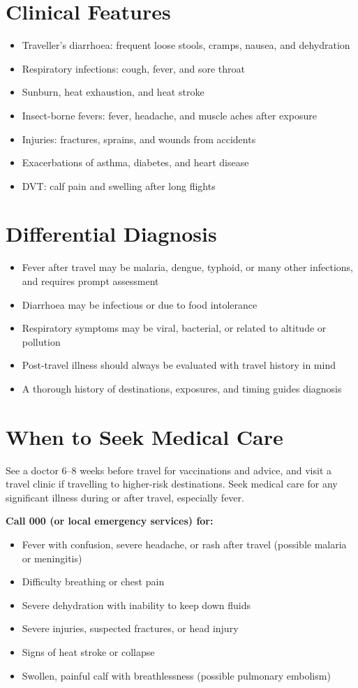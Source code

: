 \section*{Clinical Features}
\begin{itemize}
    \item Traveller's diarrhoea: frequent loose stools, cramps, nausea, and dehydration
    \item Respiratory infections: cough, fever, and sore throat
    \item Sunburn, heat exhaustion, and heat stroke
    \item Insect-borne fevers: fever, headache, and muscle aches after exposure
    \item Injuries: fractures, sprains, and wounds from accidents
    \item Exacerbations of asthma, diabetes, and heart disease
    \item DVT: calf pain and swelling after long flights
\end{itemize}

\section*{Differential Diagnosis}
\begin{itemize}
    \item Fever after travel may be malaria, dengue, typhoid, or many other infections, and requires prompt assessment
    \item Diarrhoea may be infectious or due to food intolerance
    \item Respiratory symptoms may be viral, bacterial, or related to altitude or pollution
    \item Post-travel illness should always be evaluated with travel history in mind
    \item A thorough history of destinations, exposures, and timing guides diagnosis
\end{itemize}

\section*{When to Seek Medical Care}
See a doctor 6--8 weeks before travel for vaccinations and advice, and visit a travel clinic if travelling to higher-risk destinations. Seek medical care for any significant illness during or after travel, especially fever.

\textbf{Call 000 (or local emergency services) for:}
\begin{itemize}
    \item Fever with confusion, severe headache, or rash after travel (possible malaria or meningitis)
    \item Difficulty breathing or chest pain
    \item Severe dehydration with inability to keep down fluids
    \item Severe injuries, suspected fractures, or head injury
    \item Signs of heat stroke or collapse
    \item Swollen, painful calf with breathlessness (possible pulmonary embolism)
\end{itemize}

